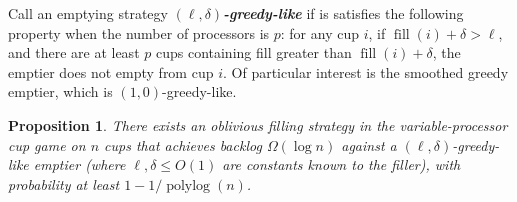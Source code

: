 \documentclass[twocolumn]{article}[11pt]
\newcommand{\defn}[1]{{\textit{\textbf{\boldmath #1}}}}
\DeclareMathOperator{\polylog}{\text{polylog}}
\DeclareMathOperator{\fil}{\text{fill}}
\newtheorem{proposition}{Proposition}
\begin{document}
Call an emptying strategy $(\ell, \delta)$\defn{-greedy-like} if is satisfies
the following property when the number of processors is $p$: for any cup
$i$, if $\fil(i) + \delta > \ell$, and there are at least $p$ cups containing fill
greater than $\fil(i) + \delta$, the emptier does not empty from cup $i$.
Of particular interest is the smoothed greedy emptier, which is $(1, 0)$-greedy-like.

\begin{proposition}
  \label{prop:obliviousBase}
  There exists an oblivious filling strategy in the variable-processor cup game
  on $n$ cups that achieves backlog $\Omega(\log n)$ against a $(\ell,
  \delta)$-greedy-like emptier (where $\ell, \delta \le O(1)$ are constants
  known to the filler), with probability at least $1-1/\polylog(n)$.
\end{proposition}
\end{document}
